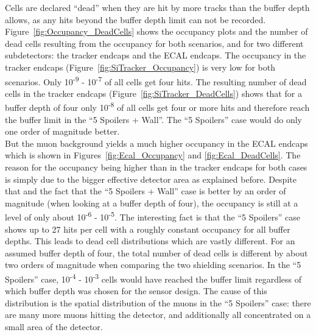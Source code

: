 Cells are declared ``dead'' when they are hit by more tracks than the buffer depth allows, as any hits beyond the buffer depth limit can not be recorded.
Figure~\ref{fig:Occupancy_DeadCells} shows the occupancy plots and the number of dead cells resulting from the occupancy for both scenarios, and for two different subdetectors: the tracker endcaps and the ECAL endcaps. 
The occupancy in the tracker endcaps (Figure~\ref{fig:SiTracker_Occupancy}) is very low for both scenarios.
Only 10\textsuperscript{-9} - 10\textsuperscript{-7} of all cells get four hits.
The resulting number of dead cells in the tracker endcaps (Figure~\ref{fig:SiTracker_DeadCells}) shows that for a buffer depth of four only 10\textsuperscript{-8} of all cells get four or more hits and therefore reach the buffer limit in the ``5 Spoilers + Wall''.
The ``5 Spoilers'' case would do only one order of magnitude better.\\
But the muon background yields a much higher occupancy in the ECAL endcaps which is shown in Figures~\ref{fig:Ecal_Occupancy} and \ref{fig:Ecal_DeadCells}.
The reason for the occupancy being higher than in the tracker endcaps for both cases is simply due to the bigger effective detector area as explained before.
Despite that and the fact that the ``5 Spoilers + Wall'' case is better by an order of magnitude (when looking at a buffer depth of four), the occupancy is still at a level of only about 10\textsuperscript{-6} - 10\textsuperscript{-5}.
The interesting fact is that the ``5 Spoilers'' case shows up to 27 hits per cell with a roughly constant occupancy for all buffer depths.
This leads to dead cell distributions which are vastly different.
For an assumed buffer depth of four, the total number of dead cells is different by about two orders of magnitude when comparing the two shielding scenarios.
In the ``5 Spoilers'' case, 10\textsuperscript{-4} - 10\textsuperscript{-3} cells would have reached the buffer limit regardless of which buffer depth was chosen for the sensor design.
The cause of this distribution is the spatial distribution of the muons in the ``5 Spoilers'' case: there are many more muons hitting the detector, and additionally all concentrated on a small area of the detector.

